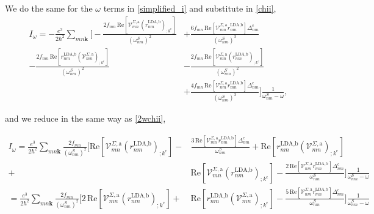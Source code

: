\documentclass[10pt]{article}
\begin{document}
We do the same for the $\omega$ terms in \eqref{simplified_i} and substitute in \eqref{chii},
\begin{align}\label{wchii}
I_{\omega}
= -\frac{e^3}{2\hbar^2}\sum_{mn\mathbf{k}}
\Biggl[
-\frac{2f_{mn}\,\mathrm{Re}\left[\mathcal{V}^{\Sigma,\text{a}}_{mn}\left(r^{\text{LDA,b}}_{nm}\right)_{;k^{\text{c}}}\right]}{(\omega^{S}_{nm})^{2}}
&+ \frac{6f_{mn}\,\mathrm{Re}\left[\mathcal{V}^{\Sigma,\text{a}}_{mn}r^{\text{LDA,b}}_{nm}\right]\Delta^{\text{c}}_{nm}}{(\omega^{S}_{nm})^{3}}\nonumber\\
- \frac{2f_{mn}\,\mathrm{Re}\left[r^{\text{LDA,b}}_{nm}\left(\mathcal{V}^{\Sigma,\text{a}}_{mn}\right)_{;k^{\text{c}}}\right]}{(\omega^{S}_{nm})^{2}}
&- \frac{2f_{mn}\,\mathrm{Re}\left[\mathcal{V}^{\Sigma,\text{a}}_{mn}\left(r^{\text{LDA,b}}_{nm}\right)_{;k^{\text{c}}}\right]}{(\omega^{S}_{nm})^{2}}\nonumber\\
&+ \frac{4f_{mn}\,\mathrm{Re}\left[\mathcal{V}^{\Sigma,\text{a}}_{nm}r^{\text{LDA,b}}_{mn}\right]\Delta_{nm}^{\text{c}}}{(\omega^{S}_{nm})^{3}}
\Biggr]\frac{1}{\omega^{S}_{nm}-\omega},
\end{align}

and we reduce in the same way as \eqref{2wchii},

\begin{align}\label{wchii_simplified}
I_{\omega}
= \frac{e^3}{2\hbar^2}\sum_{mn\mathbf{k}}\frac{2f_{mn}}{(\omega^{S}_{nm})^{2}}
\Biggl[
  \mathrm{Re}\left[\mathcal{V}^{\Sigma,\text{a}}_{mn}\left(r^{\text{LDA,b}}_{nm}\right)_{;k^{\text{c}}}\right]
- &\frac{3\,\mathrm{Re}\left[\mathcal{V}^{\Sigma,\text{a}}_{mn}r^{\text{LDA,b}}_{nm}\right]\Delta^{\text{c}}_{nm}}{\omega^{S}_{nm}} 
+  \mathrm{Re}\left[r^{\text{LDA,b}}_{nm}\left(\mathcal{V}^{\Sigma,\text{a}}_{mn}\right)_{;k^{\text{c}}}\right]\nonumber\\
+ &\mathrm{Re}\left[\mathcal{V}^{\Sigma,\text{a}}_{mn}\left(r^{\text{LDA,b}}_{nm}\right)_{;k^{\text{c}}}\right]
- \frac{2\,\mathrm{Re}\left[\mathcal{V}^{\Sigma,\text{a}}_{nm}r^{\text{LDA,b}}_{mn}\right]\Delta_{nm}^{\text{c}}}{\omega^{S}_{nm}}
\Biggr]\frac{1}{\omega^{S}_{nm}-\omega}\nonumber\\
= \frac{e^3}{2\hbar^2}\sum_{mn\mathbf{k}}\frac{2f_{mn}}{(\omega^{S}_{nm})^{2}}
\Biggl[
   2\,\mathrm{Re}\left[\mathcal{V}^{\Sigma,\text{a}}_{mn}\left(r^{\text{LDA,b}}_{nm}\right)_{;k^{\text{c}}}\right]
+ &\mathrm{Re}\left[r^{\text{LDA,b}}_{nm}\left(\mathcal{V}^{\Sigma,\text{a}}_{mn}\right)_{;k^{\text{c}}}\right]
- \frac{5\,\mathrm{Re}\left[\mathcal{V}^{\Sigma,\text{a}}_{nm}r^{\text{LDA,b}}_{mn}\right]\Delta_{nm}^{\text{c}}}{\omega^{S}_{nm}}
\Biggr]\frac{1}{\omega^{S}_{nm}-\omega}
\end{align}
\end{document}
